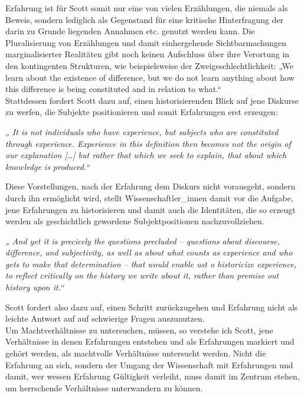 \noindent Erfahrung ist für Scott somit nur eine von vielen
Erzählungen, die niemals als Beweis, sondern lediglich als Gegenstand für eine
kritische Hinterfragung der darin zu Grunde liegenden Annahmen etc. genutzt
werden kann. Die Pluralisierung von Erzählungen und damit einhergehende
Sichtbarmachungen marginalisierter Realitäten gibt noch keinen Aufschluss über
ihre Verortung in den kontingenten Strukturen, wie beispielsweise der
Zweigeschlechtlichkeit: „We learn about the existence of difference, but we do
not learn anything about how this difference is being constituted and in
relation to what.“ \footnotemark {}\\  
Stattdessen fordert Scott dazu auf, einen historisierenden Blick auf jene Diskurse zu werfen, die Subjekte positionieren und somit Erfahrungen erst erzeugen:
\begin{myenv}
 \textit{„
It is not individuals who have experience, but subjects who are constituted through experience. Experience in this definition then becomes not the origin of our explanation […] but rather that which we seek to explain, that about which knowledge is produced.“\footnotemark{}
}\end{myenv}
Diese Vorstellungen, nach der Erfahrung dem Diskurs nicht vorausgeht, sondern
durch ihn ermöglicht wird, stellt Wissenschaftler\_innen damit vor die Aufgabe,
jene Erfahrungen zu historisieren und damit auch die Identitäten, die so
erzeugt werden als geschichtlich gewordene Subjektpositionen nachzuvollziehen.
\begin{myenv}
 \textit{„
 And yet it is precicely the questions precluded – questions about discourse, difference, and subjectivity, as well as about what counts as experience and who gets to make that determination – that would enable ust o historicize experience, to reflect critically on the history we write about it, rather than premise out history upon it.“\footnotemark{}
} 
\end{myenv}
Scott fordert also dazu auf, einen Schritt zurückzugehen und Erfahrung nicht
als leichte Antwort auf auf schwierige Fragen auszunutzen.\\
Um Machtverhältnisse
zu untersuchen, müssen, so verstehe ich Scott, jene Verhältnisse in denen
Erfahrungen entstehen und als Erfahrungen markiert und gehört werden, als
machtvolle Verhältnisse untersucht werden. Nicht die Erfahrung an sich, sondern
der Umgang der Wissenschaft mit Erfahrungen und damit, wer wessen Erfahrung
Gültigkeit verleiht, muss damit im Zentrum stehen, um herrschende Verhältnisse
unterwandern zu können.\\



